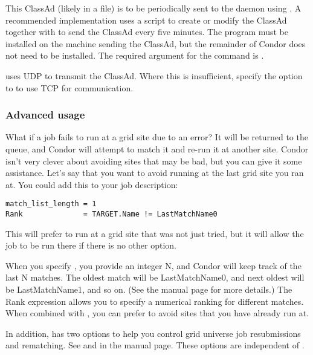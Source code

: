 This ClassAd (likely in a file)
is to be periodically sent to the  daemon
using .
A recommended implementation uses a script to create or modify
the ClassAd together with
 to send the ClassAd every five minutes.
The  program must be installed on the 
machine sending the ClassAd, but the remainder of Condor
does not need to be installed.
The required argument for the  command
is .

 uses UDP to transmit the ClassAd.
Where this is insufficient,
specify the  option to 
to use TCP for communication. 

\subsubsection{Advanced usage}

What if a job fails to run at a grid site due to an error? It will be
returned to the queue, and Condor will attempt to match it and
re-run it at another site. Condor isn't very clever about avoiding
sites that may be bad, but you can give it some assistance. Let's say
that you want to avoid running at the last grid site you ran at. You
could add this to your job description:

\footnotesize
\begin{verbatim}
match_list_length = 1
Rank              = TARGET.Name != LastMatchName0
\end{verbatim}
\normalsize

This will prefer to run at a grid site that was not just tried, but it
will allow the job to be run there if there is no other option. 

When you specify , you provide an integer N, and
Condor will keep track of the last N matches. The oldest match will be
LastMatchName0, and next oldest will be LastMatchName1, and so on. (See
the  manual page for more details.) The Rank expression
allows you to specify a numerical ranking for different matches. When
combined with , you can prefer to avoid sites that
you have already run at. 

In addition,  has two options to help you control
grid universe job resubmissions and rematching.  See  and
 in the  manual page.
These options are independent of .

